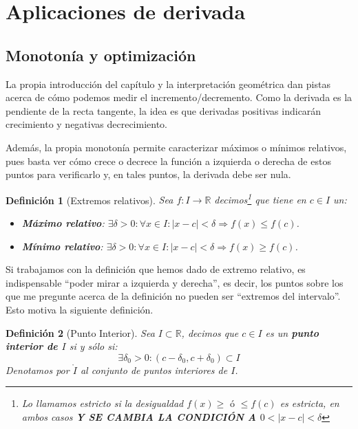 \documentclass[10pt,a4paper,openright]{book}
\theoremstyle{break}
\newtheorem{defi}{Definición}[chapter]
\begin{document}
\section{Aplicaciones de derivada}

\subsection{Monotonía y optimización}
La propia introducción del capítulo y la interpretación geométrica dan pistas acerca de cómo podemos medir el incremento/decremento. Como la derivada es la pendiente de la recta tangente, la idea es que derivadas positivas indicarán crecimiento y negativas decrecimiento.

Además, la propia monotonía permite caracterizar máximos o mínimos relativos, pues basta ver cómo crece o decrece la función a izquierda o derecha de estos puntos para verificarlo y, en tales puntos, la derivada debe ser nula.

\begin{defi}[Extremos relativos]
Sea $f:I\rightarrow \mathbb R$ decimos\footnote{Lo llamamos estricto si la desigualdad $f(x)\geq \mbox{ ó }\leq f(c)$ es estricta, en ambos casos \textbf{Y SE CAMBIA LA CONDICIÓN A $0<|x-c|<\delta$}} que tiene en $c\in I$ un:
\begin{itemize}
\item \textbf{Máximo relativo}: $\exists \delta>0: \forall x \in I: |x-c|<\delta \Rightarrow f(x)\leq f(c)$.
\item \textbf{Mínimo relativo}: $\exists \delta>0: \forall x \in I: |x-c|<\delta \Rightarrow f(x)\geq f(c)$.
\end{itemize}
\end{defi}

Si trabajamos con la definición que hemos dado de extremo relativo, es indispensable ``poder mirar a izquierda y derecha'', es decir, los puntos sobre los que me pregunte acerca de la definición no pueden ser ``extremos del intervalo''. Esto motiva la siguiente definición.

\begin{defi}[Punto Interior]
Sea $I\subset\mathbb{R}$, decimos que $c\in I$ es un \textbf{punto interior de $I$} si y sólo si:
$$\exists \delta_0 >0: (c-\delta_0, c+\delta_0)\subset I$$
Denotamos por $\mathring{I}$ al conjunto de puntos interiores de $I$.
\end{defi}
\end{document}
